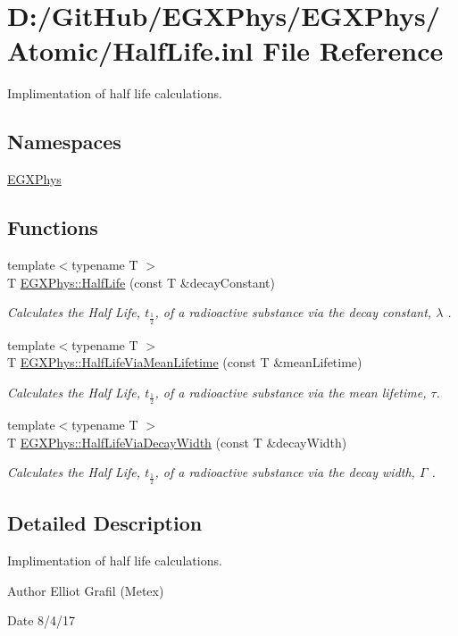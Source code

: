 \hypertarget{_half_life_8inl}{}\section{D\+:/\+Git\+Hub/\+E\+G\+X\+Phys/\+E\+G\+X\+Phys/\+Atomic/\+Half\+Life.inl File Reference}
\label{_half_life_8inl}


Implimentation of half life calculations.  


\subsection*{Namespaces}
\begin{DoxyCompactItemize}
\item 
 \mbox{\hyperlink{namespace_e_g_x_phys}{E\+G\+X\+Phys}}
\end{DoxyCompactItemize}
\subsection*{Functions}
\begin{DoxyCompactItemize}
\item 
{\footnotesize template$<$typename T $>$ }\\T \mbox{\hyperlink{group___e_g_x_phys-_half_life_ga21d268f154fb91c1c556bbfa7fe83ac1}{E\+G\+X\+Phys\+::\+Half\+Life}} (const T \&decay\+Constant)
\begin{DoxyCompactList}\small\item\em Calculates the Half Life, $t_{\frac{1}{2}}$, of a radioactive substance via the decay constant, $\lambda$ . \end{DoxyCompactList}\item 
{\footnotesize template$<$typename T $>$ }\\T \mbox{\hyperlink{group___e_g_x_phys-_half_life_gacddef16b62e98b214ec8dd8af7da7dce}{E\+G\+X\+Phys\+::\+Half\+Life\+Via\+Mean\+Lifetime}} (const T \&mean\+Lifetime)
\begin{DoxyCompactList}\small\item\em Calculates the Half Life, $t_{\frac{1}{2}}$, of a radioactive substance via the mean lifetime, $\tau$. \end{DoxyCompactList}\item 
{\footnotesize template$<$typename T $>$ }\\T \mbox{\hyperlink{group___e_g_x_phys-_half_life_gaba3fda944d1a68ee1016a1f2f5809359}{E\+G\+X\+Phys\+::\+Half\+Life\+Via\+Decay\+Width}} (const T \&decay\+Width)
\begin{DoxyCompactList}\small\item\em Calculates the Half Life, $t_{\frac{1}{2}}$, of a radioactive substance via the decay width, $\Gamma$ . \end{DoxyCompactList}\end{DoxyCompactItemize}


\subsection{Detailed Description}
Implimentation of half life calculations. 

\begin{DoxyAuthor}{Author}
Elliot Grafil (Metex) 
\end{DoxyAuthor}
\begin{DoxyDate}{Date}
8/4/17 
\end{DoxyDate}
